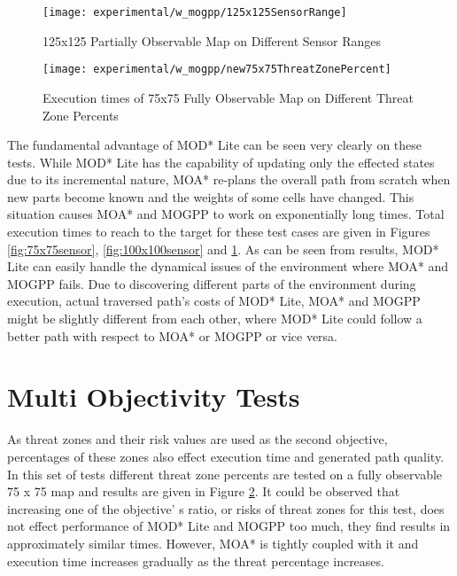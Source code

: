 \begin{figure}
\centering
\texttt{[image: experimental/w\_mogpp/125x125SensorRange]}
\caption{125x125 Partially Observable Map on Different Sensor Ranges}
\label{fig:125x125sensor}
\end{figure}

\begin{figure}
\centering
\texttt{[image: experimental/w\_mogpp/new75x75ThreatZonePercent]}
\caption{Execution times of 75x75 Fully Observable Map on Different Threat Zone Percents}
\label{fig:tzratio}
\end{figure}


The fundamental advantage of MOD* Lite can be seen very clearly on these tests. While MOD* Lite has the capability of updating only the effected states due to its incremental nature, MOA* re-plans the overall path from scratch when new parts become known and the weights of some cells have changed. This situation causes MOA* and MOGPP to work on exponentially long times. Total execution times to reach to the target for these test cases are given in Figures \ref{fig:75x75sensor}, \ref{fig:100x100sensor} and \ref{fig:125x125sensor}. As can be seen from results, MOD* Lite can easily handle the dynamical issues of the environment where MOA* and MOGPP fails. Due to discovering different parts of the environment during execution, actual traversed path's costs of MOD* Lite, MOA* and MOGPP might be slightly different from each other, where MOD* Lite could follow a better path with respect to MOA* or MOGPP or vice versa.

\section{Multi Objectivity Tests}

As threat zones and their risk values are used as the second objective, percentages of these zones also effect execution time and generated path quality. In this set of tests different threat zone percents are tested on a fully observable 75 x 75 map and results are given in Figure \ref{fig:tzratio}. It could be observed that increasing one of the objective' s ratio, or risks of threat zones for this test, does not effect performance of  MOD* Lite and MOGPP too much, they find results in approximately similar times. However, MOA* is tightly coupled with it and execution time increases gradually as the threat percentage increases.